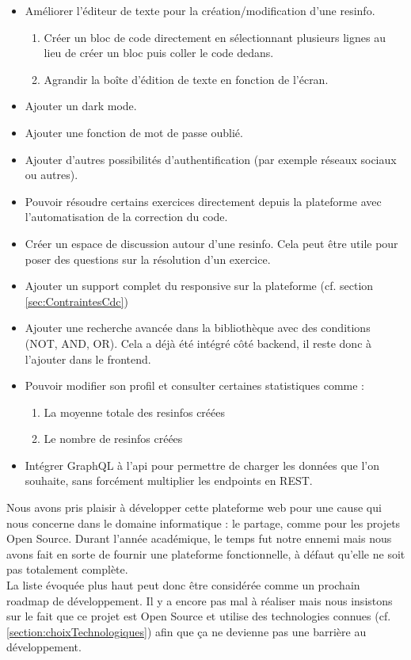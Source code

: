 \begin{itemize}
    \item Améliorer l'éditeur de texte pour la création/modification d'une \gls{resinfo}.
    \begin{enumerate}
        \item Créer un bloc de code directement en sélectionnant plusieurs lignes au lieu de créer un bloc puis coller le code dedans.
        \item Agrandir la boîte d'édition de texte en fonction de l'écran.
    \end{enumerate}
    \item Ajouter un dark mode.
    \item Ajouter une fonction de mot de passe oublié.
    \item Ajouter d'autres possibilités d'authentification (par exemple réseaux sociaux ou autres).
    \item Pouvoir résoudre certains exercices directement depuis la plateforme avec l'automatisation de la correction du code.
    \item Créer un espace de discussion autour d'une \gls{resinfo}. Cela peut être utile pour poser des questions sur la résolution d'un exercice.
    \item Ajouter un support complet du responsive sur la plateforme (cf. section \ref{sec:ContraintesCdc})
    \item Ajouter une recherche avancée dans la bibliothèque avec des conditions (NOT, AND, OR). Cela a déjà été intégré côté \gls{backend}, il reste donc à l'ajouter dans le \gls{frontend}.
    \item Pouvoir modifier son profil et consulter certaines statistiques comme :
    \begin{enumerate}
        \item La moyenne totale des \glspl{resinfo} créées
        \item Le nombre de \glspl{resinfo} créées
    \end{enumerate}
    \item Intégrer GraphQL à l'\gls{api} pour permettre de charger les données que l'on souhaite, sans forcément multiplier les endpoints en REST.
\end{itemize}

Nous avons pris plaisir à développer cette plateforme web pour une cause qui nous concerne dans le domaine informatique : le partage, comme pour les projets Open Source. Durant l'année académique, le temps fut notre ennemi mais nous avons fait en sorte de fournir une plateforme fonctionnelle, à défaut qu'elle ne soit pas totalement complète.\\

La liste évoquée plus haut peut donc être considérée comme un prochain roadmap de développement. Il y a encore pas mal à réaliser mais nous insistons sur le fait que ce projet est Open Source et utilise des technologies connues (cf. \ref{section:choixTechnologiques}) afin que ça ne devienne pas une barrière au développement.